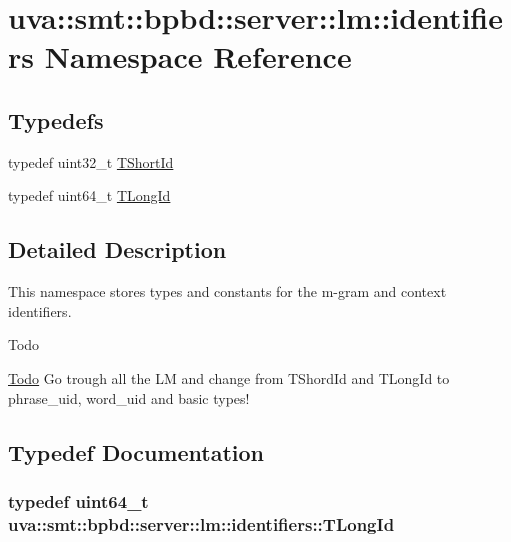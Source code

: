 \hypertarget{namespaceuva_1_1smt_1_1bpbd_1_1server_1_1lm_1_1identifiers}{}\section{uva\+:\+:smt\+:\+:bpbd\+:\+:server\+:\+:lm\+:\+:identifiers Namespace Reference}
\label{namespaceuva_1_1smt_1_1bpbd_1_1server_1_1lm_1_1identifiers}
\subsection*{Typedefs}
\begin{DoxyCompactItemize}
\item 
typedef uint32\+\_\+t \hyperlink{namespaceuva_1_1smt_1_1bpbd_1_1server_1_1lm_1_1identifiers_a33043a191e9a637dea742a89d23c8bdc}{T\+Short\+Id}
\item 
typedef uint64\+\_\+t \hyperlink{namespaceuva_1_1smt_1_1bpbd_1_1server_1_1lm_1_1identifiers_a6841847096e455ad3c38689bc548b3b0}{T\+Long\+Id}
\end{DoxyCompactItemize}


\subsection{Detailed Description}
This namespace stores types and constants for the m-\/gram and context identifiers. \begin{DoxyRefDesc}{Todo}
\item[\hyperlink{todo__todo000006}{Todo}]Go trough all the L\+M and change from T\+Shord\+Id and T\+Long\+Id to phrase\+\_\+uid, word\+\_\+uid and basic types! \end{DoxyRefDesc}


\subsection{Typedef Documentation}
\hypertarget{namespaceuva_1_1smt_1_1bpbd_1_1server_1_1lm_1_1identifiers_a6841847096e455ad3c38689bc548b3b0}{}
\subsubsection[{T\+Long\+Id}]{\setlength{\rightskip}{0pt plus 5cm}typedef uint64\+\_\+t {\bf uva\+::smt\+::bpbd\+::server\+::lm\+::identifiers\+::\+T\+Long\+Id}}\label{namespaceuva_1_1smt_1_1bpbd_1_1server_1_1lm_1_1identifiers_a6841847096e455ad3c38689bc548b3b0}


